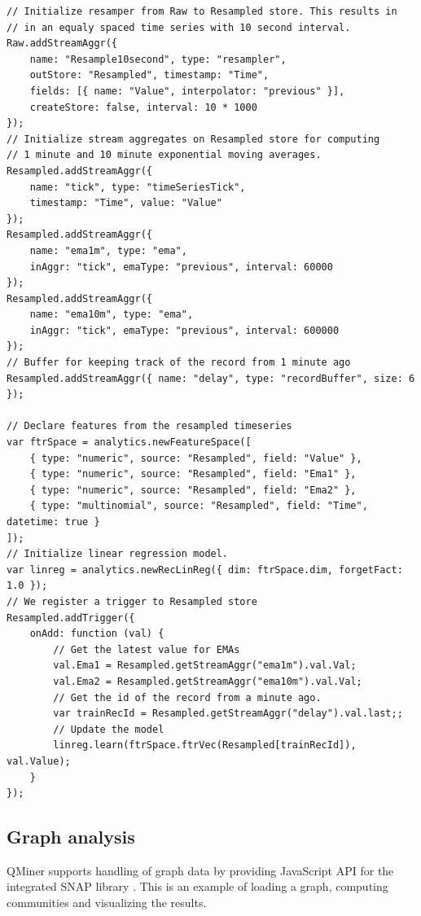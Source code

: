 \documentclass{article} %
\begin{document}
\begin{lstlisting}[caption=Time series processing] 	
// Initialize resamper from Raw to Resampled store. This results in
// in an equaly spaced time series with 10 second interval.
Raw.addStreamAggr({
    name: "Resample10second", type: "resampler",
    outStore: "Resampled", timestamp: "Time",
    fields: [{ name: "Value", interpolator: "previous" }],
    createStore: false, interval: 10 * 1000
});
// Initialize stream aggregates on Resampled store for computing
// 1 minute and 10 minute exponential moving averages.
Resampled.addStreamAggr({
    name: "tick", type: "timeSeriesTick",
    timestamp: "Time", value: "Value"
});
Resampled.addStreamAggr({
    name: "ema1m", type: "ema",
    inAggr: "tick", emaType: "previous", interval: 60000
});
Resampled.addStreamAggr({
    name: "ema10m", type: "ema",
    inAggr: "tick", emaType: "previous", interval: 600000
});
// Buffer for keeping track of the record from 1 minute ago
Resampled.addStreamAggr({ name: "delay", type: "recordBuffer", size: 6 });

// Declare features from the resampled timeseries
var ftrSpace = analytics.newFeatureSpace([
    { type: "numeric", source: "Resampled", field: "Value" },
    { type: "numeric", source: "Resampled", field: "Ema1" },
    { type: "numeric", source: "Resampled", field: "Ema2" },
    { type: "multinomial", source: "Resampled", field: "Time", datetime: true }
]);
// Initialize linear regression model.
var linreg = analytics.newRecLinReg({ dim: ftrSpace.dim, forgetFact: 1.0 });
// We register a trigger to Resampled store
Resampled.addTrigger({
    onAdd: function (val) {
        // Get the latest value for EMAs
        val.Ema1 = Resampled.getStreamAggr("ema1m").val.Val;
        val.Ema2 = Resampled.getStreamAggr("ema10m").val.Val;
        // Get the id of the record from a minute ago.
        var trainRecId = Resampled.getStreamAggr("delay").val.last;;
        // Update the model
        linreg.learn(ftrSpace.ftrVec(Resampled[trainRecId]), val.Value);
    }
});

\end{lstlisting}


\subsection{Graph analysis}
QMiner supports handling of graph data by providing JavaScript API for the integrated SNAP library \cite{snap}. 
This is an example of loading a graph, computing communities and visualizing the results.
\end{document}

